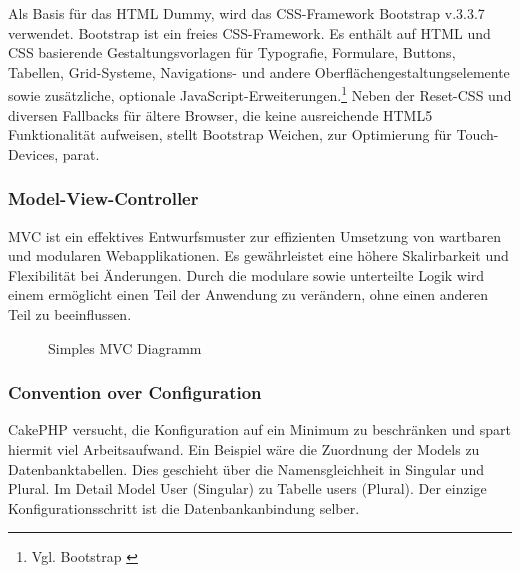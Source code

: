 Als Basis für das HTML Dummy, wird das CSS-Framework
Bootstrap v.3.3.7 verwendet.
Bootstrap ist ein freies CSS-Framework. Es enthält auf HTML und CSS basierende
Gestaltungsvorlagen für Typografie, Formulare, Buttons, Tabellen, Grid-Systeme, 
Navigations- und andere Oberflächengestaltungselemente sowie zusätzliche, 
optionale JavaScript-Erweiterungen.\footnote{Vgl. Bootstrap
\cite{wiki:Bootstrap_(Framework)}} Neben der Reset-CSS und diversen Fallbacks
für ältere Browser, die keine ausreichende HTML5 Funktionalität aufweisen, stellt Bootstrap Weichen,
\zB zur Optimierung für Touch-Devices, parat. 


\subsubsection{Model-View-Controller}
\label{sec:MVC}
\ac{MVC} ist ein effektives Entwurfsmuster zur effizienten Umsetzung von 
wartbaren und modularen Webapplikationen. Es gewährleistet eine höhere
Skalirbarkeit und Flexibilität bei Änderungen. Durch die modulare sowie
unterteilte Logik wird einem ermöglicht einen Teil der Anwendung zu verändern,
ohne einen anderen Teil zu beeinflussen.


\begin{figure}[h]
\caption{Simples MVC Diagramm}
\end{figure}


\subsubsection{Convention over Configuration}
\label{sec:CoC}
CakePHP versucht, die Konfiguration auf ein Minimum zu beschränken und
spart hiermit viel Arbeitsaufwand. Ein Beispiel wäre die Zuordnung der Models zu
Datenbanktabellen. Dies geschieht über die Namensgleichheit in Singular und Plural. 
Im Detail Model User (Singular) zu Tabelle users (Plural). Der einzige
Konfigurationsschritt ist die Datenbankanbindung selber.


